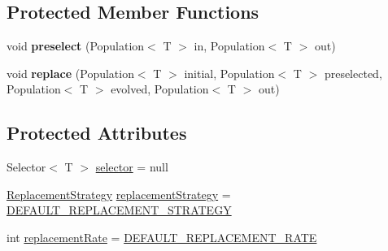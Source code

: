 \subsection*{Protected Member Functions}
\begin{CompactItemize}
\item 
\hypertarget{classjenes_1_1stage_1_1operator_1_1common_1_1_steady_state_3_01_t_01extends_01_chromosome_01_4_4cc6031dfce1f23a49dfb6270be45358}{
void \textbf{preselect} (Population$<$ T $>$ in, Population$<$ T $>$ out)}
\label{classjenes_1_1stage_1_1operator_1_1common_1_1_steady_state_3_01_t_01extends_01_chromosome_01_4_4cc6031dfce1f23a49dfb6270be45358}

\item 
\hypertarget{classjenes_1_1stage_1_1operator_1_1common_1_1_steady_state_3_01_t_01extends_01_chromosome_01_4_edd46a5fd49b71554354612f991c1482}{
void \textbf{replace} (Population$<$ T $>$ initial, Population$<$ T $>$ preselected, Population$<$ T $>$ evolved, Population$<$ T $>$ out)}
\label{classjenes_1_1stage_1_1operator_1_1common_1_1_steady_state_3_01_t_01extends_01_chromosome_01_4_edd46a5fd49b71554354612f991c1482}

\end{CompactItemize}
\subsection*{Protected Attributes}
\begin{CompactItemize}
\item 
Selector$<$ T $>$ \hyperlink{classjenes_1_1stage_1_1operator_1_1common_1_1_steady_state_3_01_t_01extends_01_chromosome_01_4_83a734a69acdc4ee13d42982a43e8ba1}{selector} = null
\item 
\hyperlink{classjenes_1_1stage_1_1operator_1_1common_1_1_steady_state_3_01_t_01extends_01_chromosome_01_4_da95b83b7d620e80c70fbed3b8159de1}{ReplacementStrategy} \hyperlink{classjenes_1_1stage_1_1operator_1_1common_1_1_steady_state_3_01_t_01extends_01_chromosome_01_4_4d727adbb35eaad5d78fc59abaabea0c}{replacementStrategy} = \hyperlink{classjenes_1_1stage_1_1operator_1_1common_1_1_steady_state_3_01_t_01extends_01_chromosome_01_4_4ed786deaaaefebd47fffc18e99b3710}{DEFAULT\_\-REPLACEMENT\_\-STRATEGY}
\item 
int \hyperlink{classjenes_1_1stage_1_1operator_1_1common_1_1_steady_state_3_01_t_01extends_01_chromosome_01_4_84dd70ced0dad9433e4168f18eb735f9}{replacementRate} = \hyperlink{classjenes_1_1stage_1_1operator_1_1common_1_1_steady_state_3_01_t_01extends_01_chromosome_01_4_9700692d577e24267d1105f2a6e3d379}{DEFAULT\_\-REPLACEMENT\_\-RATE}
\end{CompactItemize}


